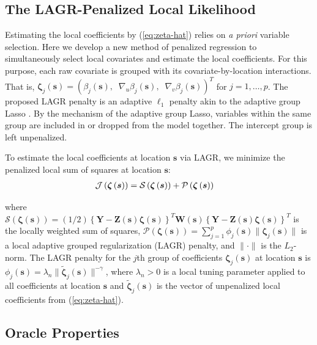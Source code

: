 \documentclass[12pt,english,authoryear, review]{article}\usepackage[]{graphicx}\usepackage[]{color}
\theoremstyle{plain}
\theoremstyle{plain}
\begin{document}
\subsection{The LAGR-Penalized Local Likelihood}

Estimating the local coefficients by (\ref{eq:zeta-hat}) relies on
\emph{a priori} variable selection. Here we develop a new method of
penalized regression to simultaneously select local covariates and
estimate the local coefficients. For this purpose, each raw covariate
is grouped with its covariate-by-location interactions. That is, $\bm{\zeta}_{j}(\bm{s})=\left(\beta_{j}(\bm{s}),\;\;\nabla_{u}\beta_{j}(\bm{s}),\;\;\nabla_{v}\beta_{j}(\bm{s})\right)^{T}$
for $j=1,\dots,p$. The proposed LAGR penalty is an adaptive $\ell_{1}$
penalty akin to the adaptive group Lasso \citep{Wang-Leng-2008,Zou-2006}.
By the mechanism of the adaptive group Lasso, variables within the
same group are included in or dropped from the model together. The
intercept group is left unpenalized.

To estimate the local coefficients at location $\bm{s}$ via LAGR,
we minimize the penalized local sum of squares at location $\bm{s}$:
\begin{align}
\mathcal{J}\left(\bm{\zeta}\left(\bm{s}\right)\right) & =\mathcal{S}\left(\bm{\zeta}\left(\bm{s}\right)\right)+\mathcal{P}\left(\bm{\zeta}\left(\bm{s}\right)\right)\notag\label{eq:adaptive-lasso-WLS}
\end{align}


where $\mathcal{S}\left(\bm{\zeta}\left(\bm{s}\right)\right)=(1/2)\left\{ \bm{Y}-\bm{Z}(\bm{s})\bm{\zeta}(\bm{s})\right\} ^{T}\bm{W}(\bm{s})\left\{ \bm{Y}-\bm{Z}(\bm{s})\bm{\zeta}(\bm{s})\right\} ^{T}$
is the locally weighted sum of squares, $\mathcal{P}\left(\bm{\zeta}\left(\bm{s}\right)\right)=\sum_{j=1}^{p}\phi_{j}(\bm{s})\|\bm{\zeta}_{j}(\bm{s})\|$
is a local adaptive grouped regularization (LAGR) penalty, and $\|\cdot\|$
is the $L_{2}$-norm. The LAGR penalty for the $j$th group of coefficients
$\bm{\zeta}_{j}(\bm{s})$ at location $\bm{s}$ is $\phi_{j}(\bm{s})=\lambda_{n}\|\tilde{\bm{\zeta}}_{j}(\bm{s})\|^{-\gamma}$,
where $\lambda_{n}>0$ is a local tuning parameter applied to all
coefficients at location $\bm{s}$ and $\tilde{\bm{\zeta}}_{j}(\bm{s})$
is the vector of unpenalized local coefficients from (\ref{eq:zeta-hat}).


\subsection{Oracle Properties\label{sub:oracle-properties}}
\end{document}
